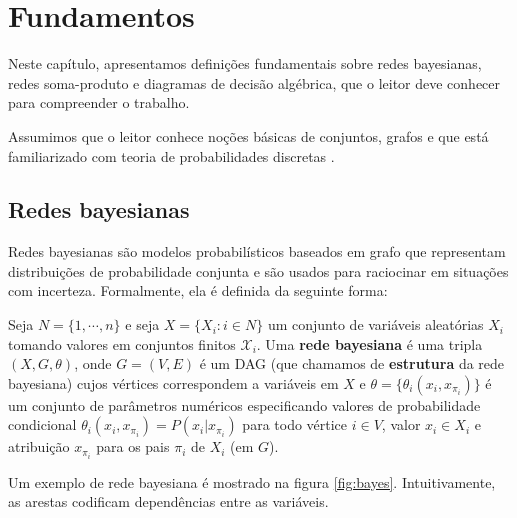 \chapter{Fundamentos}
\label{cap:fundamentos}

Neste capítulo, apresentamos definições fundamentais sobre redes bayesianas, redes soma-produto e diagramas de decisão algébrica, que o leitor deve conhecer para compreender o trabalho.

Assumimos que o leitor conhece noções básicas de conjuntos, grafos e que está familiarizado com teoria de probabilidades discretas \cite{Koller2009}.

\section{Redes bayesianas}

Redes bayesianas são modelos probabilísticos baseados em grafo que representam distribuições de probabilidade conjunta e são usados para raciocinar em situações com incerteza. Formalmente, ela é definida \cite{Nie2014} da seguinte forma:

\begin{definition}
  Seja $N = \{ 1, \cdots, n \}$ e seja $X = \{X_i : i \in N\}$ um conjunto de variáveis aleatórias $X_i$ tomando valores em conjuntos finitos $\mathcal{X}_i$. Uma \textbf{rede bayesiana} é uma tripla $(X, G, \theta)$, onde $G = (V, E)$ é um DAG (que chamamos de \textbf{estrutura} da rede bayesiana) cujos vértices correspondem a variáveis em $X$ e $\theta = \{\theta_i(x_i, x_{\pi_i})\}$ é um conjunto de parâmetros numéricos especificando valores de probabilidade condicional $\theta_i(x_i, x_{\pi_i}) = P(x_i | x_{\pi_i})$ para todo vértice $i \in V$, valor $x_i \in X_i$ e atribuição $x_{\pi_i}$ para os pais $\pi_i$ de $X_i$ (em $G$).
\end{definition}

Um exemplo de rede bayesiana é mostrado na figura \ref{fig:bayes}. Intuitivamente, as arestas codificam dependências entre as variáveis.

